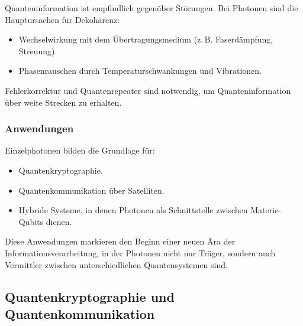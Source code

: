 Quanteninformation ist empfindlich gegenüber Störungen. Bei Photonen sind die Hauptursachen für Dekohärenz:
\begin{itemize}
	\item Wechselwirkung mit dem Übertragungsmedium (z.\,B. Faserdämpfung, Streuung).
	\item Phasenrauschen durch Temperaturschwankungen und Vibrationen.
\end{itemize}
Fehlerkorrektur und Quantenrepeater sind notwendig, um Quanteninformation über weite Strecken zu erhalten.

\subsubsection{Anwendungen}

Einzelphotonen bilden die Grundlage für:
\begin{itemize}
	\item Quantenkryptographie.
	\item Quantenkommunikation über Satelliten.
	\item Hybride Systeme, in denen Photonen als Schnittstelle zwischen Materie-Qubits dienen.
\end{itemize}
Diese Anwendungen markieren den Beginn einer neuen Ära der Informationsverarbeitung, in der Photonen nicht nur Träger, sondern auch Vermittler zwischen unterschiedlichen Quantensystemen sind.

\subsection{Quantenkryptographie und Quantenkommunikation} \label{sec:quantum_crypto}

